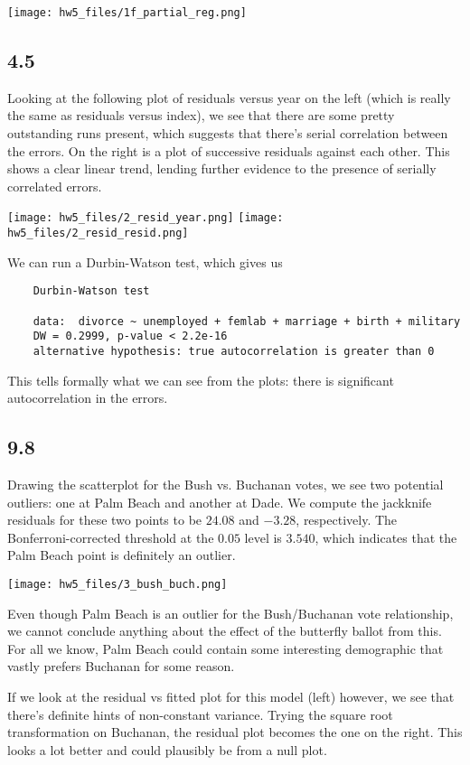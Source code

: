\documentclass{article}
\begin{document}
\texttt{[image: hw5\_files/1f\_partial\_reg.png]}

\subsection*{4.5}
Looking at the following plot of residuals versus year on the left (which is really the same as residuals versus index), we see that there are some pretty outstanding runs present, which suggests that there's serial correlation between the errors. On the right is a plot of successive residuals against each other. This shows a clear linear trend, lending further evidence to the presence of serially correlated errors.

\texttt{[image: hw5\_files/2\_resid\_year.png]}
\texttt{[image: hw5\_files/2\_resid\_resid.png]}

We can run a Durbin-Watson test, which gives us 
\begin{verbatim}
    Durbin-Watson test

    data:  divorce ~ unemployed + femlab + marriage + birth + military
    DW = 0.2999, p-value < 2.2e-16
    alternative hypothesis: true autocorrelation is greater than 0
\end{verbatim}
This tells formally what we can see from the plots: there is significant autocorrelation in the errors.
\subsection*{9.8}
Drawing the scatterplot for the Bush vs. Buchanan votes, we see two potential outliers: one at Palm Beach and another at Dade. We compute the jackknife residuals for these two points to be $24.08$ and $-3.28$, respectively. The Bonferroni-corrected threshold at the $0.05$ level is $3.540$, which indicates that the Palm Beach point is definitely an outlier.

\texttt{[image: hw5\_files/3\_bush\_buch.png]}

Even though Palm Beach is an outlier for the Bush/Buchanan vote relationship, we cannot conclude anything about the effect of the butterfly ballot from this. For all we know, Palm Beach could contain some interesting demographic that vastly prefers Buchanan for some reason. 

If we look at the residual vs fitted plot for this model (left) however, we see that there's definite hints of non-constant variance. Trying the square root transformation on Buchanan, the residual plot becomes the one on the right. This looks a lot better and could plausibly be from a null plot.
\end{document}
